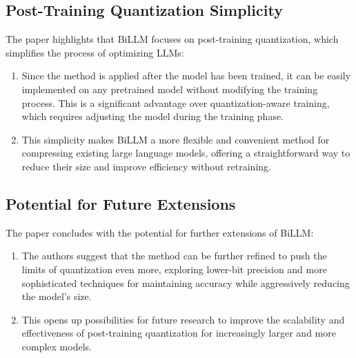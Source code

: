 \documentclass{report}
\begin{document}
	\subsection{Post-Training Quantization Simplicity}
	The paper highlights that BiLLM focuses on post-training quantization, which simplifies the process of optimizing LLMs:
	\begin{enumerate}
		\item 
		Since the method is applied after the model has been trained, it can be easily implemented on any pretrained model without modifying the training process. This is a significant advantage over quantization-aware training, which requires adjusting the model during the training phase.
		
		\item 
		This simplicity makes BiLLM a more flexible and convenient method for compressing existing large language models, offering a straightforward way to reduce their size and improve efficiency without retraining.
	\end{enumerate}
	
	\subsection{Potential for Future Extensions}
	The paper concludes with the potential for further extensions of BiLLM:
	\begin{enumerate}
		\item 
		The authors suggest that the method can be further refined to push the limits of quantization even more, exploring lower-bit precision and more sophisticated techniques for maintaining accuracy while aggressively reducing the model's size.
		
		\item 
		This opens up possibilities for future research to improve the scalability and effectiveness of post-training quantization for increasingly larger and more complex models.
	\end{enumerate}
	
	
\end{document}
